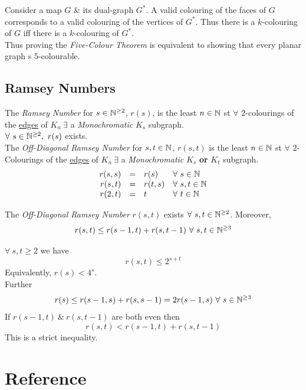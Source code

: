 \documentclass[11pt,a4paper]{article}
\begin{document}
Consider a map $G$ \& its dual-graph $G^*$. A valid colouring of the faces of $G$ corresponds to a valid colouring of the vertices of $G^*$. Thus there is a $k$-colouring of $G$ iff there is a $k$-colouring of $G^*$.\\
\NB Thus proving the \textit{Five-Colour Theorem} is equivalent to showing that every planar graph s $5$-colourable.

\subsection{Ramsey Numbers}

The \textit{Ramsey Number} for $s\in\mathbb{N}^{\geq2}$, $r(s)$, is the least $n\in\mathbb{N}$ st $\forall$ $2$-colourings of the \underline{edges} of $K_n\ \exists$ a \textit{Monochromatic} $K_s$ subgraph.\\
\NB $\forall\ s\in\mathbb{N}^{\geq2},\ r(s)$ exists.\\

The \textit{Off-Diagonal Ramsey Number} for $s,t\in\mathbb{N}$, $r(s,t)$ is the least $n\in\mathbb{N}$ st $\forall$ $2$-Colourings of the \underline{edges} of $K_n\ \exists$ a \textit{Monochromatic} $K_s$ \textbf{or} $K_t$ subgraph.\\

\[\begin{array}{rcll}
r(s,s)&=&r(s)&\forall\ s\in\mathbb{N}\\
r(s,t)&=&r(t,s)&\forall\ s,t\in\mathbb{N}\\
r(2,t)&=&t&\forall\ t\in\mathbb{N}
\end{array}\]

The \textit{Off-Diagonal Ramsey Number} $r(s,t)$ exists $\forall\ s,t\in\mathbb{N}^{\geq2}$. Moreover,
$$r(s,t)\leq r(s-1,t)+r(s,t-1)\ \forall\ s,t\in\nats^{\geq3}$$

$\forall\ s,t\geq2$ we have
$$r(s,t)\leq2^{s+t}$$
Equivalently, $r(s)<4^s$.\\
Further
$$r(s)\leq r(s-1,s)+r(s,s-1)=2r(s-1,s)\ \forall\ s\in\mathbb{N}^{\geq3}$$ 
If $r(s-1,t)\ \&\ r(s,t-1)$ are both even then
$$r(s,t)<r(s-1,t)+r(s,t-1)$$
\NB This is a strict inequality.\\


\newpage
\setcounter{section}{-1}

\section{Reference}
\end{document}
